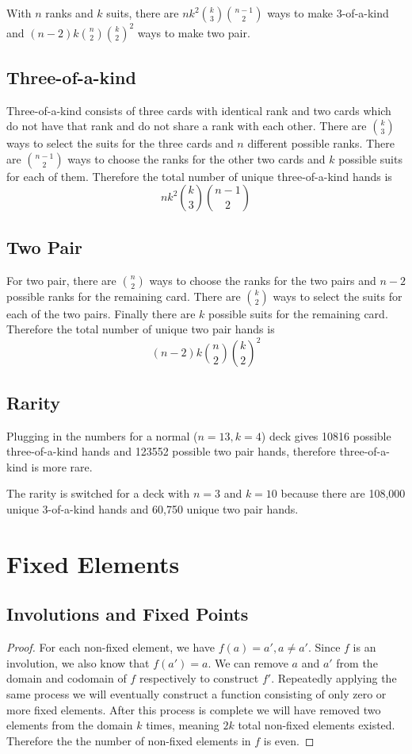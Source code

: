\documentclass[12pt]{article}
\begin{document}
With $n$ ranks and $k$ suits, there are $nk^2\binom{k}{3}\binom{n-1}{2}$ ways to make 3-of-a-kind and $(n-2)k\binom{n}{2}\binom{k}{2}^2$ ways to make two pair. 

\subsection*{Three-of-a-kind}

Three-of-a-kind consists of three cards with identical rank and two cards which do not have that rank and do not share a rank with each other. There are $\binom{k}{3}$ ways to select the suits for the three cards and $n$ different possible ranks. There are $\binom{n-1}{2}$ ways to choose the ranks for the other two cards and $k$ possible suits for each of them. Therefore the total number of unique three-of-a-kind hands is 
\[
nk^2\binom{k}{3}\binom{n-1}{2}
\]

\subsection*{Two Pair}
For two pair, there are $\binom{n}{2}$ ways to choose the ranks for the two pairs and $n-2$ possible ranks for the remaining card. There are $\binom{k}{2}$ ways to select the suits for each of the two pairs. Finally there are $k$ possible suits for the remaining card. Therefore the total number of unique two pair hands is
\[
(n-2)k\binom{n}{2}\binom{k}{2}^2
\]

\subsection*{Rarity}
Plugging in the numbers for a normal ($n=13, k=4$) deck gives 10816 possible three-of-a-kind hands and 123552 possible two pair hands, therefore three-of-a-kind is more rare.

The rarity is switched for a deck with $n=3$ and $k=10$ because there are 108,000 unique 3-of-a-kind hands and 60,750 unique two pair hands.


\section{Fixed Elements}

\subsection*{Involutions and Fixed Points}

\begin{proof}
For each non-fixed element, we have $f(a) = a', a \neq a'$. Since $f$ is an involution, we also know that $f(a') = a$. We can remove $a$ and $a'$ from the domain and codomain of $f$ respectively to construct $f'$. Repeatedly applying the same process we will eventually construct a function consisting of only zero or more fixed elements. After this process is complete we will have removed two elements from the domain $k$ times, meaning $2k$ total non-fixed elements existed. Therefore the the number of non-fixed elements in $f$ is even.\end{proof}
\end{document}
